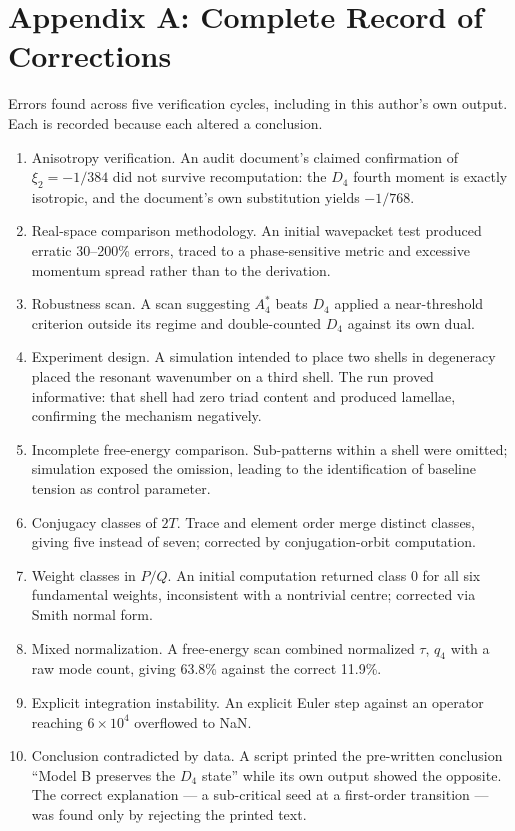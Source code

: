 \documentclass[11pt,a4paper]{article}
\begin{document}
\section{Appendix A: Complete Record of Corrections}
Errors found across five verification cycles, including in this author's own output. Each is recorded because each altered a conclusion.
\begin{enumerate}
\item Anisotropy verification. An audit document's claimed confirmation of $\xi_2 = -1/384$ did not survive recomputation: the $D_4$ fourth moment is exactly isotropic, and the document's own substitution yields $-1/768$.
\item Real-space comparison methodology. An initial wavepacket test produced erratic 30--200\% errors, traced to a phase-sensitive metric and excessive momentum spread rather than to the derivation.
\item Robustness scan. A scan suggesting $A_4^*$ beats $D_4$ applied a near-threshold criterion outside its regime and double-counted $D_4$ against its own dual.
\item Experiment design. A simulation intended to place two shells in degeneracy placed the resonant wavenumber on a third shell. The run proved informative: that shell had zero triad content and produced lamellae, confirming the mechanism negatively.
\item Incomplete free-energy comparison. Sub-patterns within a shell were omitted; simulation exposed the omission, leading to the identification of baseline tension as control parameter.
\item Conjugacy classes of $2T$. Trace and element order merge distinct classes, giving five instead of seven; corrected by conjugation-orbit computation.
\item Weight classes in $P/Q$. An initial computation returned class 0 for all six fundamental weights, inconsistent with a nontrivial centre; corrected via Smith normal form.
\item Mixed normalization. A free-energy scan combined normalized $\tau$, $q_4$ with a raw mode count, giving 63.8\% against the correct 11.9\%.
\item Explicit integration instability. An explicit Euler step against an operator reaching $6 \times 10^4$ overflowed to NaN.
\item Conclusion contradicted by data. A script printed the pre-written conclusion ``Model B preserves the $D_4$ state'' while its own output showed the opposite. The correct explanation --- a sub-critical seed at a first-order transition --- was found only by rejecting the printed text.

\end{enumerate}
\end{document}
